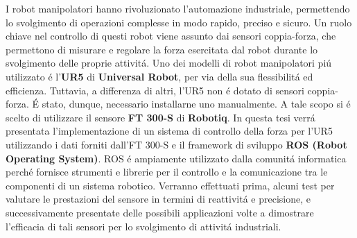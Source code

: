 I robot manipolatori hanno rivoluzionato l'automazione industriale, permettendo lo svolgimento
di operazioni complesse in modo rapido, preciso e sicuro.
Un ruolo chiave nel controllo di questi robot viene assunto dai sensori coppia-forza,
che permettono di misurare e regolare la forza esercitata dal robot durante lo svolgimento delle proprie attivit\'{a}. 
Uno dei modelli di robot manipolatori pi\'{u} utilizzato \'{e} l'\textbf{UR5} di \textbf{Universal Robot}, per via della sua flessibilit\'{a} 
ed efficienza.
Tuttavia, a differenza di altri, l'UR5 non \'{e} dotato di sensori coppia-forza.
\'{E} stato, dunque, necessario installarne uno manualmente. A tale scopo si \'{e} scelto di utilizzare il sensore \textbf{FT 300-S} 
di \textbf{Robotiq}. 
In questa tesi verr\'{a} presentata l'implementazione di un sistema di controllo della forza per l'UR5 utilizzando i dati
forniti dall'FT 300-S e il framework di sviluppo \textbf{ROS (Robot Operating System)}.
ROS \'{e} ampiamente utilizzato dalla comunit\'{a} informatica perch\'{e} fornisce strumenti e librerie 
per il controllo e la comunicazione tra le componenti di un sistema robotico.
Verranno effettuati prima, alcuni test per valutare le prestazioni del sensore in termini di reattivit\'{a} e precisione, 
e successivamente presentate delle possibili applicazioni volte a dimostrare l'efficacia
di tali sensori per lo svolgimento di attivit\'{a} industriali.
